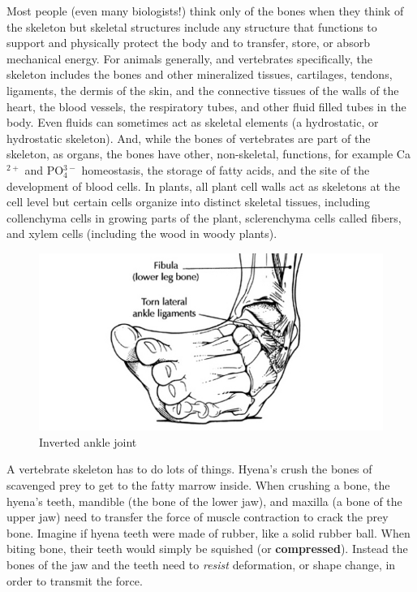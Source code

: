 \documentclass[]{book}
\begin{document}
Most people (even many biologists!) think only of the bones when they
think of the skeleton but skeletal structures include any structure that
functions to support and physically protect the body and to transfer,
store, or absorb mechanical energy. For animals generally, and
vertebrates specifically, the skeleton includes the bones and other
mineralized tissues, cartilages, tendons, ligaments, the dermis of the
skin, and the connective tissues of the walls of the heart, the blood
vessels, the respiratory tubes, and other fluid filled tubes in the
body. Even fluids can sometimes act as skeletal elements (a hydrostatic,
or hydrostatic skeleton). And, while the bones of vertebrates are part
of the skeleton, as organs, the bones have other, non-skeletal,
functions, for example Ca\(^{2+}\) and PO\(_4^{3-}\) homeostasis, the
storage of fatty acids, and the site of the development of blood cells.
In plants, all plant cell walls act as skeletons at the cell level but
certain cells organize into distinct skeletal tissues, including
collenchyma cells in growing parts of the plant, sclerenchyma cells
called fibers, and xylem cells (including the wood in woody plants).

\begin{figure}
\includegraphics[width=8.33in]{images/materials_chapter/inversion} \caption{Inverted ankle joint}\label{fig:unnamed-chunk-2}
\end{figure}

A vertebrate skeleton has to do lots of things. Hyena's crush the bones
of scavenged prey to get to the fatty marrow inside. When crushing a
bone, the hyena's teeth, mandible (the bone of the lower jaw), and
maxilla (a bone of the upper jaw) need to transfer the force of muscle
contraction to crack the prey bone. Imagine if hyena teeth were made of
rubber, like a solid rubber ball. When biting bone, their teeth would
simply be squished (or \textbf{compressed}). Instead the bones of the
jaw and the teeth need to \emph{resist} deformation, or shape change, in
order to transmit the force.
\end{document}
